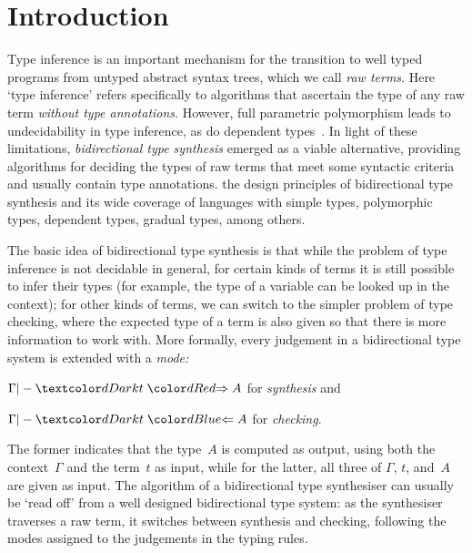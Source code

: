 
\section{Introduction}\label{sec:intro}

Type inference is an important mechanism for the transition to well typed programs from untyped abstract syntax trees, which we call \emph{raw terms}.
Here `type inference' refers specifically to algorithms that ascertain the type of any raw term \emph{without type annotations}.
However, full parametric polymorphism leads to undecidability in type inference, as do dependent types~\cite{Wells1999,Dowek1993}.
In light of these limitations, \emph{bidirectional type synthesis} emerged as a viable alternative, providing algorithms for deciding the types of raw terms that meet some syntactic criteria and usually contain type annotations.
 the design principles of bidirectional type synthesis and its wide coverage of languages with simple types, polymorphic types, dependent types, gradual types, among others.

The basic idea of bidirectional type synthesis is that while the problem of type inference is not decidable in general, for certain kinds of terms it is still possible to infer their types (for example, the type of a variable can be looked up in the context); for other kinds of terms, we can switch to the simpler problem of type checking, where the expected type of a term is also given so that there is more information to work with.
More formally, every judgement in a bidirectional type system is extended with a \emph{mode:}
\begin{inlineenum}
  \item $\Gamma |- \isTerm{t} \syn A$ for \emph{synthesis} and 
  \item $\Gamma |- \isTerm{t} \chk A$ for \emph{checking}.
\end{inlineenum}
The former indicates that the type~$A$ is computed as output, using both the context~$\Gamma$ and the term~$t$ as input, while for the latter, all three of $\Gamma$, $t$, and~$A$ are given as input.
The algorithm of a bidirectional type synthesiser can usually be `read off' from a well designed bidirectional type system: as the synthesiser traverses a raw term, it switches between synthesis and checking, following the modes assigned to the judgements in the typing rules.

